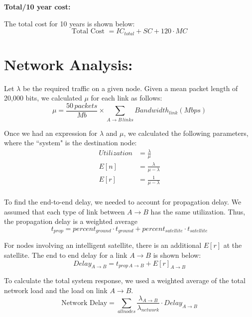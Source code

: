 \documentclass{article}
\begin{document}
\noindent \textbf{Total/10 year cost:}

The total cost for 10 years is shown below:
\begin{equation}
\text{Total Cost } = IC_{total} + SC + 120 \cdot MC
\end{equation}

\section{Network Analysis:}
Let $\lambda$ be the required traffic on a given node.
Given a mean packet length of 20,000 bits, we calculated $\mu$ for each link as follows:
\begin{equation}
\mu = \frac{50 \, packets}{Mb} \times \sum_{A \rightarrow B \, links} Bandwidth_{link} (Mbps)
\end{equation}

Once we had an expression for $\lambda$ and $\mu$, we calculated the following parameters, where the ``system" is the destination node:
\begin{align*}
Utilization &=  \frac{\lambda}{\mu} \\
E[n]		&= \frac{\lambda}{\mu - \lambda} \\
E[r] 		&= \frac{1}{\mu - \lambda} \\
\end{align*}

To find the end-to-end delay, we needed to account for propagation delay.
We assumed that each type of link between $A \rightarrow B$ has the same utilization.
Thus, the propagation delay is a weighted average
\begin{equation}
t_{prop} = percent_{ground} \cdot t_{ground} + percent_{satellite} \cdot t_{satellite}
\end{equation}

For nodes involving an intelligent satellite, there is an additional $E[r]$ at the satellite.
The end to end delay for a link $A \rightarrow B$ is shown below:
\begin{equation}
Delay_{A \rightarrow B} = t_{prop \, A \rightarrow B} + E[r]_{A \rightarrow B}
\end{equation}

To calculate the total system response, we used a weighted average of the total network load and the load on link $A \rightarrow B$.
\begin{equation}
\text{Network Delay} = \sum_{all nodes } \frac{\lambda_{A \rightarrow B}}{\lambda_{network}} \cdot Delay_{A \rightarrow B}
\end{equation}
\end{document}
